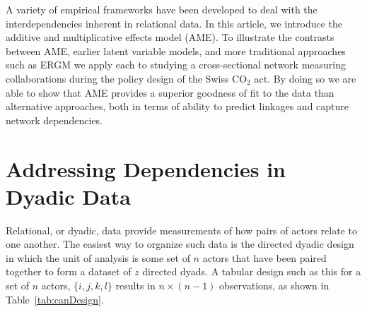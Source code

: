 \documentclass[11pt,pdflatex]{elsarticle}
\begin{document}

A variety of empirical frameworks have been developed to deal with the interdependencies inherent in relational data. In this article, we introduce the additive and multiplicative effects model (AME). To illustrate the contrasts between AME, earlier latent variable models, and more traditional approaches such as ERGM we apply each to studying a cross-sectional network measuring collaborations during the policy design of the Swiss CO$_{2}$ act. By doing so we are able to show that AME provides a superior goodness of fit to the data than alternative approaches, both in terms of ability to predict linkages and capture network dependencies. 

\section{\textbf{Addressing Dependencies in Dyadic Data}}

Relational, or dyadic, data provide measurements of how pairs of actors relate to one another. The easiest way to organize such data is the directed dyadic design in which the unit of analysis is some set of $n$ actors that have been paired together to form a dataset of $z$ directed dyads. A tabular design such as this for a set of $n$ actors, $\{i, j, k, l \}$ results in $n \times (n-1)$ observations, as shown in Table~\ref{tab:canDesign}. 
\end{document}

